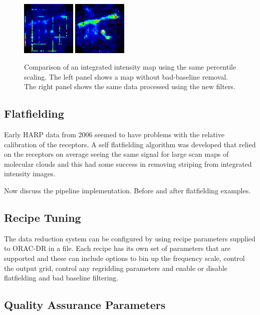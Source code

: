 \documentclass[final,authoryear,5p,times,twocolumn]{elsarticle}
\begin{document}
\begin{figure}
\includegraphics[width=0.23\textwidth]{P61_f3a}
\includegraphics[width=0.23\textwidth]{P61_f3b}
\caption{Comparison of an integrated intensity map using the same
  percentile scaling.  The left panel shows a map without bad-baseline
  removal.  The right panel shows the same data processed using the
  new filters.}
\label{fig:badbase:results}
\end{figure}

\subsection{Flatfielding}

Early HARP data from 2006 seemed to have problems with the relative
calibration of the receptors. A self flatfielding algorithm was
developed that relied on the receptors on average seeing the same
signal for large scan maps of molecular clouds
\citep{2010MNRAS.401..455C} and this had some success in removing
striping from integrated intensity images.

Now discuss the pipeline implementation. Before and after flatfielding examples.

\subsection{Recipe Tuning}

The data reduction system can be configured by using recipe parameters
supplied to ORAC-DR in a file. Each recipe has its own set of
parameters that are supported and these can include options to bin up
the frequency scale, control the output grid, control any regridding
parameters and enable or disable flatfielding and bad baseline filtering.

\subsection{Quality Assurance Parameters}
\end{document}
